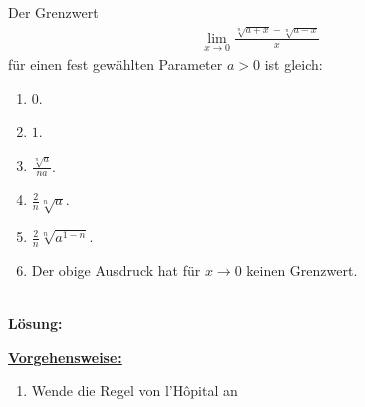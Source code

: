 \subsection*{}
Der Grenzwert
\begin{align*}
	\lim\limits_{x \to 0 }
	\frac{\sqrt[n]{a+x} - \sqrt[n]{a-x}}{x}
\end{align*}
für einen fest gewählten Parameter $ a > 0  $ ist gleich:
\renewcommand{\labelenumi}{(\alph{enumi})}
\begin{enumerate}
	\item 
	$0$.
	\item
	$1$.
	\item
	$\frac{\sqrt[n]{a}}{na}$.
	\item
	$\frac{2}{n} \sqrt[n]{a}$.
	\item
	$\frac{2}{n} \sqrt[n]{a^{1-n}}$.
	\item
	Der obige Ausdruck hat für $ x \to 0 $ keinen Grenzwert.	
\end{enumerate}
\ \\
\textbf{Lösung:}
\begin{mdframed}
\underline{\textbf{Vorgehensweise:}}
\renewcommand{\labelenumi}{\theenumi.}
\begin{enumerate}
\item Wende die Regel von l'H\^{o}pital an
\end{enumerate}
\end{mdframed}


